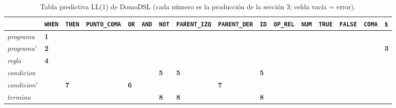 \begin{landscape}
\begin{table}[H]
\centering
\caption{Tabla predictiva LL(1) de DomoDSL (cada número es la producción de la sección 3; celda vacía = error).}
\normalsize\setlength{\tabcolsep}{2pt}\renewcommand{\arraystretch}{1.25}
\begin{tabular}{@{}l|>{\centering\arraybackslash}p{1.4cm}>{\centering\arraybackslash}p{1.4cm}>{\centering\arraybackslash}p{1.4cm}>{\centering\arraybackslash}p{1.4cm}>{\centering\arraybackslash}p{1.4cm}>{\centering\arraybackslash}p{1.4cm}>{\centering\arraybackslash}p{1.4cm}>{\centering\arraybackslash}p{1.4cm}>{\centering\arraybackslash}p{1.4cm}>{\centering\arraybackslash}p{1.4cm}>{\centering\arraybackslash}p{1.4cm}>{\centering\arraybackslash}p{1.4cm}>{\centering\arraybackslash}p{1.4cm}>{\centering\arraybackslash}p{1.4cm}>{\centering\arraybackslash}p{1.4cm}@{}}
\toprule
 & {\fontsize{6.5}{7}\selectfont \texttt{WHEN}} & {\fontsize{6.5}{7}\selectfont \texttt{THEN}} & {\fontsize{6.5}{7}\selectfont \texttt{PUNTO\_COMA}} & {\fontsize{6.5}{7}\selectfont \texttt{OR}} & {\fontsize{6.5}{7}\selectfont \texttt{AND}} & {\fontsize{6.5}{7}\selectfont \texttt{NOT}} & {\fontsize{6.5}{7}\selectfont \texttt{PARENT\_IZQ}} & {\fontsize{6.5}{7}\selectfont \texttt{PARENT\_DER}} & {\fontsize{6.5}{7}\selectfont \texttt{ID}} & {\fontsize{6.5}{7}\selectfont \texttt{OP\_REL}} & {\fontsize{6.5}{7}\selectfont \texttt{NUM}} & {\fontsize{6.5}{7}\selectfont \texttt{TRUE}} & {\fontsize{6.5}{7}\selectfont \texttt{FALSE}} & {\fontsize{6.5}{7}\selectfont \texttt{COMA}} & {\fontsize{6.5}{7}\selectfont \texttt{\$}} \\
\midrule
\textit{programa} & \cellcolor{celda}\textbf{1} &  &  &  &  &  &  &  &  &  &  &  &  &  &  \\
\textit{programa}$'$ & \cellcolor{celda}\textbf{2} &  &  &  &  &  &  &  &  &  &  &  &  &  & \cellcolor{celda}\textbf{3} \\
\textit{regla} & \cellcolor{celda}\textbf{4} &  &  &  &  &  &  &  &  &  &  &  &  &  &  \\
\textit{condicion} &  &  &  &  &  & \cellcolor{celda}\textbf{5} & \cellcolor{celda}\textbf{5} &  & \cellcolor{celda}\textbf{5} &  &  &  &  &  &  \\
\textit{condicion}$'$ &  & \cellcolor{celda}\textbf{7} &  & \cellcolor{celda}\textbf{6} &  &  &  & \cellcolor{celda}\textbf{7} &  &  &  &  &  &  &  \\
\textit{termino} &  &  &  &  &  & \cellcolor{celda}\textbf{8} & \cellcolor{celda}\textbf{8} &  & \cellcolor{celda}\textbf{8} &  &  &  &  &  &  \\

\end{tabular}
\end{table}
\end{landscape}

